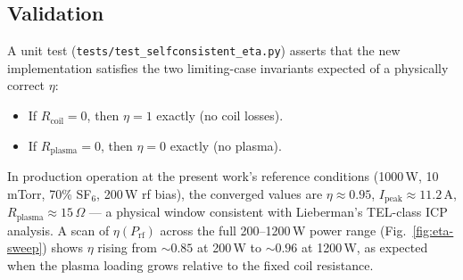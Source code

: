 \subsection*{Validation}

A unit test (\texttt{tests/test\_selfconsistent\_eta.py}) asserts that
the new implementation satisfies the two limiting-case invariants
expected of a physically correct $\eta$:

\begin{itemize}
  \item If $R_\mathrm{coil} = 0$, then $\eta = 1$ exactly (no coil losses).
  \item If $R_\mathrm{plasma} = 0$, then $\eta = 0$ exactly (no plasma).
\end{itemize}
In production operation at the present work's reference conditions
(1000\,W, 10\,mTorr, 70\% SF$_6$, 200\,W rf bias), the converged values
are $\eta \approx 0.95$, $I_\mathrm{peak} \approx 11.2$\,A,
$R_\mathrm{plasma} \approx 15$\,$\Omega$ --- a physical window consistent
with Lieberman's TEL-class ICP analysis.  A scan of $\eta(P_\mathrm{rf})$
across the full 200--1200\,W power range (Fig.~\ref{fig:eta-sweep}) shows
$\eta$ rising from $\sim 0.85$ at 200\,W to $\sim 0.96$ at 1200\,W, as
expected when the plasma loading grows relative to the fixed coil
resistance.
